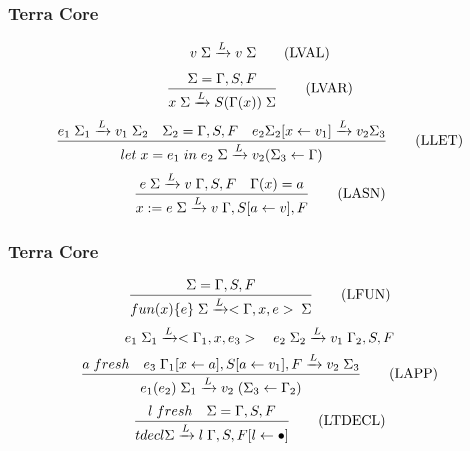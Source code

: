\documentclass{beamer}
\begin{document}
\begin{frame}
  \frametitle{Terra Core}
  \begin{equation}
    v\thickspace \Sigma \xrightarrow[]{L} v\thickspace \Sigma \tag{LVAL}
  \end{equation}
  \newline
  \begin{equation}
    \frac{\Sigma = \Gamma, S, F}{x\thickspace \Sigma \xrightarrow[]{L} S(\Gamma{(x)})\thickspace \Sigma}\tag{LVAR}
  \end{equation}
  \newline
  \begin{equation}
    \frac{e_1 \thickspace \Sigma_1 \xrightarrow[]{L} v_1 \thickspace \Sigma_2 \quad \Sigma_2 = \Gamma, S, F \quad e_2 \Sigma_2[x \leftarrow v_1] \xrightarrow[]{L} v_2 \Sigma_3}{let \thickspace x = e_1 \thickspace in \thickspace e_2 \thickspace \Sigma \xrightarrow[]{L} v_2(\Sigma_3 \leftarrow \Gamma)} \tag{LLET}
  \end{equation}
  \newline
  \begin{equation}
    \frac{e \thickspace \Sigma \xrightarrow[]{L} v\thickspace \Gamma, S, F \quad \Gamma{(x)} = a}{x := e \thickspace \Sigma \xrightarrow[]{L} v \thickspace \Gamma, S[a \leftarrow v], F} \tag{LASN}
  \end{equation}
\end{frame}

\begin{frame}
  \frametitle{Terra Core}
	\begin{equation}
    \frac{\Sigma = \Gamma, S, F}{fun(x)\{e\} \thickspace \Sigma \xrightarrow[]{L} <\Gamma, x, e> \thickspace \Sigma} \tag{LFUN}
  \end{equation}
  \newline
  \begin{gather*}
    e_1 \thickspace \Sigma_1 \xrightarrow[]{L} <\Gamma_1, x, e_3> \quad e_2 \thickspace \Sigma_2 \xrightarrow[]{L} v_1 \thickspace \Gamma_2, S, F \\
    \frac{a \thickspace fresh \quad e_3 \thickspace \Gamma_1[x \leftarrow a], S[a \leftarrow v_1], F \xrightarrow[]{L} v_2 \thickspace \Sigma_3}{e_1(e_2) \thickspace \Sigma_1 \xrightarrow[]{L} v_2 \thickspace (\Sigma_3 \leftarrow \Gamma_2)}\tag{LAPP}
  \end{gather*}
  \newline
  \begin{equation}
    \frac{l\thickspace fresh \quad \Sigma = \Gamma, S, F}{tdecl \Sigma \xrightarrow[]{L} l \thickspace \Gamma, S, F[l \leftarrow \bullet]} \tag{LTDECL}
  \end{equation}
\end{frame}
\end{document}
